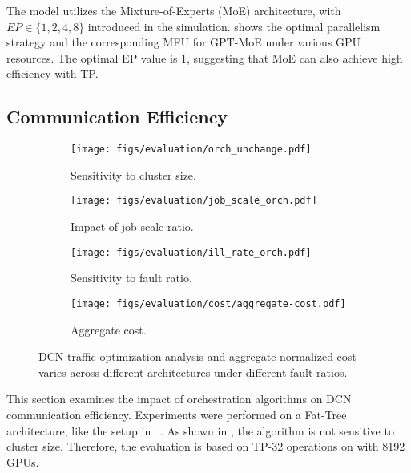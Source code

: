  The model utilizes the Mixture-of-Experts (MoE) architecture, with $EP \in \{1,2,4,8\}$ introduced in the simulation.  shows the optimal parallelism strategy and the corresponding MFU for GPT-MoE under various GPU resources. The optimal EP value is 1, suggesting that MoE can also achieve high efficiency with TP.


\vspace{-1ex}
\subsection{Communication Efficiency}
\label{sec:simulation:efficiency}

\begin{figure*}[!t]
    \centering
    \hfill{}
    \begin{subfigure}[b]{0.23\textwidth}
        \centering
        \texttt{[image: figs/evaluation/orch\_unchange.pdf]}
        \caption{Sensitivity to cluster size.}
        \label{fig:simulation:orch:cluster}
    \end{subfigure}
    \hfill{}
    \begin{subfigure}[b]{0.23\textwidth}
        \centering
        \texttt{[image: figs/evaluation/job\_scale\_orch.pdf]}
        \caption{Impact of job-scale ratio.}
        \label{fig:simulation:orch:job}
    \end{subfigure}
    \hfill{}
    \begin{subfigure}[b]{0.23\textwidth}
        \centering
        \texttt{[image: figs/evaluation/ill\_rate\_orch.pdf]}
        \caption{Sensitivity to fault ratio.}
        \label{fig:simulation:orch:fault}
    \end{subfigure}
    \hfill{}
    \begin{subfigure}[b]{0.23\textwidth}
        \centering
        \texttt{[image: figs/evaluation/cost/aggregate-cost.pdf]}
        \caption{Aggregate cost.}
        \label{fig:eval:aggregate-cost}
    \end{subfigure}
    \vspace{-2ex}
    \caption{DCN traffic optimization analysis and aggregate normalized cost varies across different architectures under different fault ratios.}
    \label{fig:simulation:job_scale:orch}
    \vspace{-3ex}
\end{figure*}

This section examines the impact of orchestration algorithms on DCN communication efficiency. Experiments were performed on a Fat-Tree architecture, like the setup in ~\cite{sigcomm2024rdmameta}. As shown in , the algorithm is not sensitive to cluster size. Therefore, the evaluation is based on TP-32 operations on \sys{} with 8192 GPUs. 

